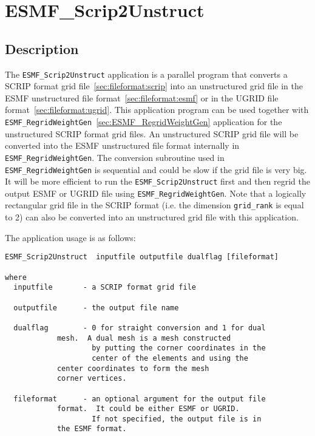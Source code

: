 
\section{ESMF\_Scrip2Unstruct}
\label{sec:ESMF_Scrip2Unstruct}

\subsection{Description}

The {\tt ESMF\_Scrip2Unstruct} application is a parallel program that converts a SCRIP format grid file~\ref{sec:fileformat:scrip} into an unstructured grid file in the ESMF unstructured file format~\ref{sec:fileformat:esmf} or in the UGRID file format~\ref{sec:fileformat:ugrid}. This application program can be used together with {\tt ESMF\_RegridWeightGen}~\ref{sec:ESMF_RegridWeightGen} application for the unstructured SCRIP format grid files.  An unstructured SCRIP grid file will be converted into the ESMF unstructured file format internally in {\tt ESMF\_RegridWeightGen}.  The conversion subroutine used in {\tt ESMF\_RegridWeightGen} is sequential and could be slow if the grid file is very big.  It will be more efficient to run the {\tt ESMF\_Scrip2Unstruct} first and then regrid the output ESMF or UGRID file using {\tt ESMF\_RegridWeightGen}.  Note that a logically rectangular grid file in the SCRIP format (i.e. the dimension {\tt grid\_rank} is equal to 2) can also be converted into an unstructured grid file with this application.

The application usage is as follows:

\begin{verbatim}
ESMF_Scrip2Unstruct  inputfile outputfile dualflag [fileformat]

where
  inputfile       - a SCRIP format grid file

  outputfile      - the output file name
 
  dualflag        - 0 for straight conversion and 1 for dual 
		    mesh.  A dual mesh is a mesh constructed 
                    by putting the corner coordinates in the 
                    center of the elements and using the 
		    center coordinates to form the mesh 
		    corner vertices.

  fileformat      - an optional argument for the output file 
		    format.  It could be either ESMF or UGRID.
                    If not specified, the output file is in 
		    the ESMF format.  
  
\end{verbatim}
